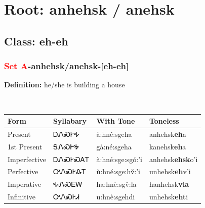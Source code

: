 \needspace{4in}
\section*{Root: anhehsk / anehsk}
\nopagebreak
{}
\needspace{3in}
\subsection*{Class: eh-eh}
\nopagebreak
\needspace{2in}
\subsubsection*{\textcolor{Red}{Set A}{-}\textbf{anhehsk/anehsk}{-}[eh-eh]}
\nopagebreak
\textbf{Definition: } he/she is building a house
\\[0.5em]
\begin{tabularx}{\textwidth}{l X X X}%
\toprule%
\textbf{Form}&\textbf{Syllabary}&\textbf{With Tone}&\textbf{Toneless}\\%
\midrule%
Present&ᎠᏁᏍᎨᎭ&à:hné:sgeha&anhehsk\textbf{eh}a\\%
1st Present&ᎦᏁᏍᎨᎭ&gà:né:sgeha&kanehsk\textbf{eh}a\\%
Imperfective&ᎠᏁᏍᎨᏍᎪᎢ&à:hné:sge:sgó:’i&anhehsk\textbf{ehsk}o'i\\%
Perfective&ᎤᏁᏍᎨᎲᎢ&ù:hné:sge:hv̌:’i&unhehsk\textbf{eh}v'i\\%
Imperative&ᎭᏁᏍᎬᎳ&ha:hnè:sgv̌:la&hanhehsk\textbf{vla}\\%
Infinitive&ᎤᏁᏍᎨᏗ&u:hnè:sgehdi&unhehsk\textbf{eht}i\\%
\bottomrule%
\end{tabularx}
\\[1em]